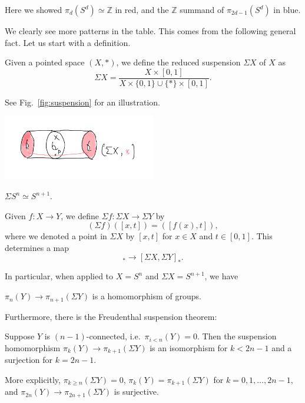 \documentclass[12pt]{article}
\numberwithin{equation}{section}
\renewenvironment{figure}[1][]{
  \begin{originalfigure}[#1]
    \begin{mdframed}[linecolor=black!0,backgroundcolor=black!1]
}{
    \end{mdframed}
  \end{originalfigure}
}
\def\bZ{\mathbb{Z}}
\begin{document}
Here we showed $\pi_d(S^d)\simeq \bZ$ in red,
and the $\bZ$ summand of $\pi_{2d-1}(S^d)$ in blue.

We clearly see more patterns in the table. 
This comes from the following general fact.
Let us start with a definition.
\begin{definition}
Given a pointed space $(X,*)$,
we define the reduced suspension $\Sigma X$ of $X$ as \begin{equation}
  \Sigma X = \frac{ X \times [0,1]}{
    X \times \{0,1\} \cup \{*\} \times [0,1]
  }. 
\end{equation}
\end{definition}

See Fig.~\ref{fig:suspension} for an illustration.
\begin{figure}
  \centering
  \includegraphics[width=0.5\textwidth]{suspension}
  \caption{The reduced suspension $\Sigma X$ of a space $X$.
  In the figure, we collapse all the points colored in red to a single point,
  which we take to be the basepoint.}
  \label{fig:suspension}
\end{figure}

\begin{proposition}
  $\Sigma S^n \simeq S^{n+1}$.
\end{proposition}

\begin{definition}
Given $f:X\to Y$, we define $\Sigma f:\Sigma X\to \Sigma Y$ by \begin{equation}
  (\Sigma f)([x,t]) = ([f(x),t]),
\end{equation}
where we denoted a point in $\Sigma X$ by $[x,t]$ for $x\in X$ and $t\in[0,1]$.
This determines a map \begin{equation}
[X,Y]_*\to [\Sigma X,\Sigma Y]_*.
\end{equation}
\end{definition}

In particular, when applied to $X=S^n$ and $\Sigma X=S^{n+1}$, we have 
\begin{proposition}
$\pi_n(Y)\to \pi_{n+1}(\Sigma Y)$ is a homomorphism of groups.
\end{proposition}
Furthermore, there is the Freudenthal suspension theorem:
\begin{theorem}
Suppose $Y$ is $(n-1)$-connected, i.e.~$\pi_{i<n}(Y)=0$.
Then the suspension homomorphism $\pi_k(Y)\to \pi_{k+1}(\Sigma Y)$ is an isomorphism for $k< 2n-1$ and a surjection for $k=2n-1$.
\end{theorem}
More explicitly, $\pi_{k\ge n}(\Sigma Y)=0$,
$\pi_{k}(Y)=\pi_{k+1}(\Sigma Y)$ for $k=0,1,\ldots,2n-1$,
and $\pi_{2n}(Y)\to \pi_{2n+1}(\Sigma Y)$ is surjective.
\end{document}
